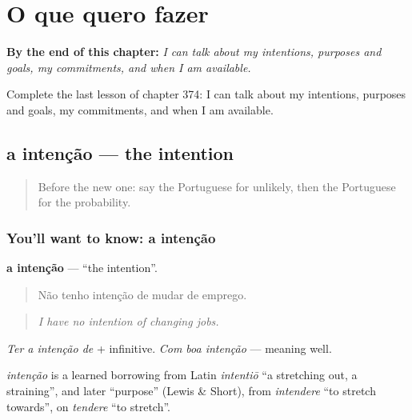 
\chapter{O que quero fazer}
\label{ch:pt-o-que-quero-fazer}

\begin{chapteropening}
\textbf{By the end of this chapter:} \emph{I can talk about my intentions, purposes and goals, my commitments, and when I am available.}

Complete the last lesson of chapter 374: I can talk about my intentions, purposes and goals, my commitments, and when I am available.
\end{chapteropening}

\section[a intenção]{a intenção — the intention}

\label{lesson:PT-C374-intencao}



\begin{quote}
Before the new one: say the Portuguese for unlikely, then the Portuguese for the probability.
\end{quote}

\subsection*{You'll want to know: a intenção}
\textbf{a intenção} — \textquotedblleft{}the intention\textquotedblright{}.

\begin{quote}
Não tenho intenção de mudar de emprego.
\end{quote}

\begin{quote}
\emph{I have no intention of changing jobs.}
\end{quote}

\emph{Ter a intenção de} + infinitive. \emph{Com boa intenção} — meaning well.

\begin{cousinweb}
\emph{intenção} is a learned borrowing from Latin \emph{intentiō} \textquotedblleft{}a stretching out, a straining\textquotedblright{}, and later \textquotedblleft{}purpose\textquotedblright{} (Lewis \& Short), from \emph{intendere} \textquotedblleft{}to stretch towards\textquotedblright{}, on \emph{tendere} \textquotedblleft{}to stretch\textquotedblright{}.
\end{cousinweb}

